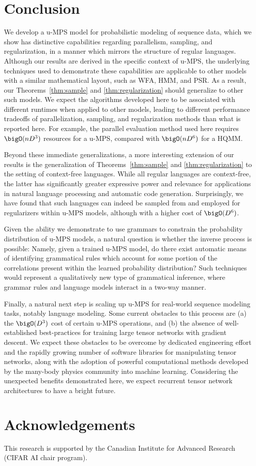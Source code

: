 \section{Conclusion}

We develop a u-MPS model for probabilistic modeling of sequence data, which we show has distinctive capabilities regarding parallelism, sampling, and regularization, in a manner which mirrors the structure of regular languages. Although our results are derived in the specific context of u-MPS, the underlying techniques used to demonstrate these capabilities are applicable to other models with a similar mathematical layout, such as WFA, HMM, and PSR. As a result, our Theorems~\ref{thm:sample} and \ref{thm:regularization} should generalize to other such models. We expect the algorithms developed here to be associated with different runtimes when applied to other models, leading to different performance tradeoffs of parallelization, sampling, and regularization methods than what is reported here. For example, the parallel evaluation method used here requires $\bigO(n D^3)$ resources for a u-MPS, compared with $\bigO(n D^6)$ for a HQMM. 

Beyond these immediate generalizations, a more interesting extension of our results is the generalization of Theorems~\ref{thm:sample} and \ref{thm:regularization} to the setting of context-free languages. While all regular languages are context-free, the latter has significantly greater expressive power and relevance for applications in natural language processing and automatic code generation. Surprisingly, we have found that such languages can indeed be sampled from and employed for regularizers within u-MPS models, although with a higher cost of $\bigO(D^6)$.

Given the ability we demonstrate to use grammars to constrain the probability distribution of u-MPS models, a natural question is whether the inverse process is possible: Namely, given a trained u-MPS model, do there exist automatic means of identifying grammatical rules which account for some portion of the correlations present within the learned probability distribution? Such techniques would represent a qualitatively new type of grammatical inference, where grammar rules and language models interact in a two-way manner. 

Finally, a natural next step is scaling up u-MPS for real-world sequence modeling tasks, notably language modeling. Some current obstacles to this process are (a) the $\bigO(D^3)$ cost of certain u-MPS operations, and (b) the absence of well-established best-practices for training large tensor networks with gradient descent. We expect these obstacles to be overcome by dedicated engineering effort and the rapidly growing number of software libraries for manipulating tensor networks, along with the adoption of powerful computational methods developed by the many-body physics community into machine learning. Considering the unexpected benefits demonstrated here, we expect recurrent tensor network architectures to have a bright future. 

\section*{Acknowledgements}
This research is supported by the Canadian Institute for Advanced Research (CIFAR AI chair program).

\appendix
\onecolumn

